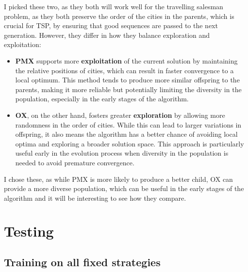 \documentclass[11pt]{scrartcl} %
\begin{document}
I picked these two, as they both will work well for the travelling salesman problem, as they both preserve the order of the cities in the parents, which is crucial for TSP, by ensuring that good sequences are passed to the next generation. However, they differ in how they balance exploration and exploitation:

\begin{itemize}
    \item \textbf{PMX} supports more \textbf{exploitation} of the current solution by maintaining the relative positions of cities, which can result in faster convergence to a local optimum. This method tends to produce more similar offspring to the parents, making it more reliable but potentially limiting the diversity in the population, especially in the early stages of the algorithm.
    
    \item \textbf{OX}, on the other hand, fosters greater \textbf{exploration} by allowing more randomness in the order of cities. While this can lead to larger variations in offspring, it also means the algorithm has a better chance of avoiding local optima and exploring a broader solution space. This approach is particularly useful early in the evolution process when diversity in the population is needed to avoid premature convergence.
\end{itemize}

I chose these, as while PMX is more likely to produce a better child, OX can provide a more diverse population, which can be useful in the early stages of the algorithm and it will be interesting to see how they compare.


\section{Testing}

\subsection{Training on all fixed strategies}



\end{document}
